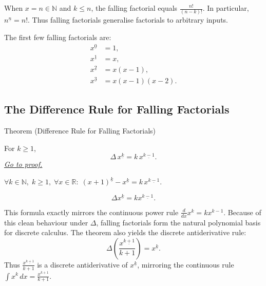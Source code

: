 \begin{remark*}[Interpretation]
When \(x = n \in \mathbb{N}\) and \(k \le n\), the falling factorial
equals \(\tfrac{n!}{(n-k)!}\). In particular, \(n^{\underline{n}} = n!\).
Thus falling factorials generalise factorials to arbitrary inputs.
\end{remark*}

\DefinitionalRoot

\begin{example*}[Examples]
The first few falling factorials are:
\[
\begin{aligned}
x^{\underline{0}} &= 1, \\
x^{\underline{1}} &= x, \\
x^{\underline{2}} &= x(x-1), \\
x^{\underline{3}} &= x(x-1)(x-2).
\end{aligned}
\]
\end{example*}

\subsection*{The Difference Rule for Falling Factorials}

\begin{theorembox}{Theorem (Difference Rule for Falling Factorials)}
\begin{theorem}
\label{thm:falling-factorial-rule}
For \(k \ge 1\),
\[
\Delta\, x^{\underline{k}} = k\,x^{\underline{k-1}}.
\]
\hyperref[prf:falling-factorial-rule]{\textit{Go to proof.}}
\end{theorem}
\end{theorembox}

\begin{remark*}
\(\forall k \in \mathbb{N},\; k \ge 1,\; \forall x \in \mathbb{R}:\;
(x+1)^{\underline{k}} - x^{\underline{k}} = k\,x^{\underline{k-1}}\).
\end{remark*}

\begin{remark*}
\[
\Delta x^{\underline{k}}=k x^{\underline{k-1}}.
\]
\end{remark*}

\begin{remark*}[Interpretation]
This formula exactly mirrors the continuous power rule
\(\tfrac{d}{dx}x^k = kx^{k-1}\). Because of this clean behaviour under
\(\Delta\), falling factorials form the natural polynomial basis for
discrete calculus.
The theorem also yields the discrete antiderivative rule:
\[
\Delta\!\left(\frac{x^{\underline{k+1}}}{k+1}\right) = x^{\underline{k}}.
\]
Thus \(\tfrac{x^{\underline{k+1}}}{k+1}\) is a discrete antiderivative
of \(x^{\underline{k}}\), mirroring the continuous rule
\(\int x^k\,dx = \tfrac{x^{k+1}}{k+1}\).
\end{remark*}

